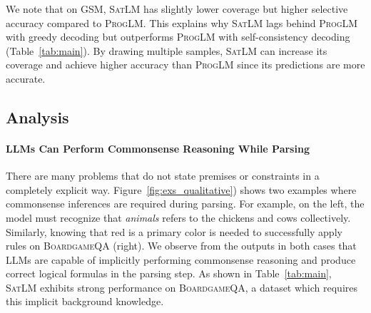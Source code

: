 \documentclass{article}
\theoremstyle{definition}
\newcommand{\gsm}{\textsc{GSM}}
\newcommand{\boardgame}{\textsc{BoardgameQA}}
\newcommand{\satlm}{\textsc{SatLM}}
\newcommand{\pallm}{\textsc{ProgLM}}
\begin{document}
We note that on \gsm{}, \satlm{} has slightly lower coverage but higher selective accuracy compared to \pallm{}. This explains why \satlm{} lags behind \pallm{} with greedy decoding but outperforms \pallm{} with self-consistency decoding (Table~\ref{tab:main}). By drawing multiple samples, \satlm{} can increase its coverage and achieve higher accuracy than \pallm{} since its predictions are more accurate.



\subsection{Analysis}







\paragraph{LLMs Can Perform Commonsense Reasoning While Parsing} There are many problems that do not state premises or constraints in a completely explicit way. Figure~\ref{fig:exs_qualitative}) shows two examples where commonsense inferences are required during parsing. For example, on the left, the model must recognize that \emph{animals} refers to the chickens and cows collectively. Similarly, knowing that red is a primary color is needed to successfully apply rules on 
\boardgame{} (right). We observe from the outputs in both cases that LLMs are capable of implicitly performing commonsense reasoning and produce correct logical formulas in the parsing step. As shown in Table~\ref{tab:main}, \satlm{} exhibits strong performance on \boardgame{}, a dataset which requires this implicit background knowledge.
\end{document}
